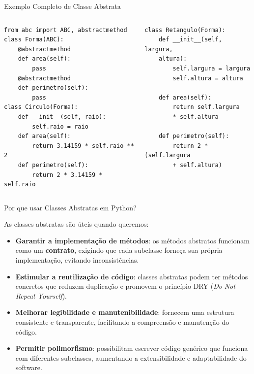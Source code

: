 \begin{frame}[fragile]{Exemplo Completo de Classe Abstrata}
    \small
    \begin{columns}[T]

        \begin{column}{0.48\textwidth}
            \begin{verbatim}
from abc import ABC, abstractmethod
class Forma(ABC):
    @abstractmethod
    def area(self):
        pass
    @abstractmethod
    def perimetro(self):
        pass
class Circulo(Forma):
    def __init__(self, raio):
        self.raio = raio
    def area(self):
        return 3.14159 * self.raio ** 2
    def perimetro(self):
        return 2 * 3.14159 * self.raio
\end{verbatim}
        \end{column}

        \begin{column}{0.48\textwidth}
            \begin{verbatim}
class Retangulo(Forma):
    def __init__(self, largura,
    altura):
        self.largura = largura
        self.altura = altura

    def area(self):
        return self.largura
        * self.altura

    def perimetro(self):
        return 2 * (self.largura
        + self.altura)
\end{verbatim}
        \end{column}

    \end{columns}
\end{frame}



\begin{frame}{Por que usar Classes Abstratas em Python?}

    As classes abstratas são úteis quando queremos:

    \begin{itemize}
        \item \textbf{Garantir a implementação de métodos}: os métodos abstratos funcionam como um \textbf{contrato}, exigindo que cada subclasse forneça sua própria implementação, evitando inconsistências.
        \item \textbf{Estimular a reutilização de código}: classes abstratas podem ter métodos concretos que reduzem duplicação e promovem o princípio DRY (\textit{Do Not Repeat Yourself}).
        \item \textbf{Melhorar legibilidade e manutenibilidade}: fornecem uma estrutura consistente e transparente, facilitando a compreensão e manutenção do código.
        \item \textbf{Permitir polimorfismo}: possibilitam escrever código genérico que funciona com diferentes subclasses, aumentando a extensibilidade e adaptabilidade do software.
    \end{itemize}

\end{frame}



